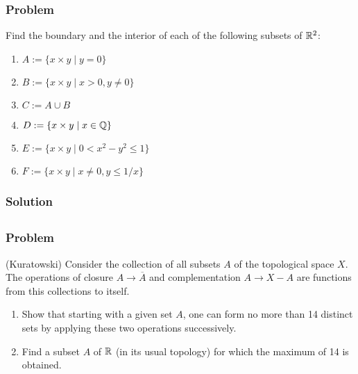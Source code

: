 \subsubsection{Problem}
Find the boundary and the interior of each of the following subsets of $\mathbb R^2$:
\begin{enumerate}
    \item $A := \{ x \times y \mid y = 0 \}$
    \item $B := \{ x \times y \mid x > 0, y \neq 0 \}$
    \item $C := A \cup B$
    \item $D := \{ x \times y \mid x \in \mathbb Q \}$
    \item $E := \{ x \times y \mid 0 < x^2-y^2 \leq 1 \}$
    \item $F := \{ x \times y \mid x \neq 0, y \leq 1/x \}$
\end{enumerate}
\subsubsection{Solution}
\todo


\subsection{}

\subsubsection{Problem}
(Kuratowski) Consider the collection of all subsets $A$ of the topological space $X$. The operations of closure $A \to \overline{A}$ and complementation $A \to X-A$ are functions from this collections to itself.
\begin{enumerate}
    \item Show that starting with a given set $A$, one can form no more than 14 distinct sets by applying these two operations successively.
    \item Find a subset $A$ of $\mathbb R$ (in its usual topology) for which the maximum of 14 is obtained.
\end{enumerate}
